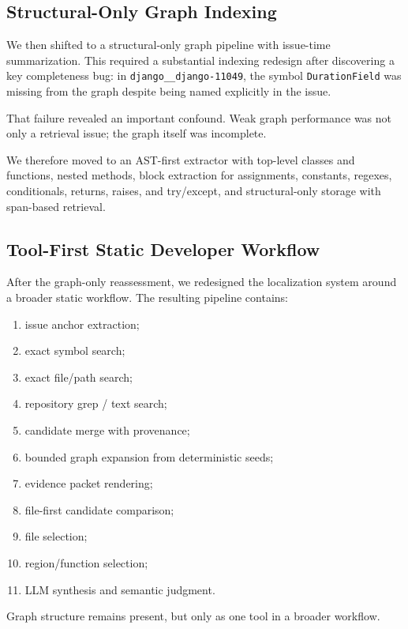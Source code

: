 \documentclass[11pt]{article}
\begin{document}
\subsection{Structural-Only Graph Indexing}

We then shifted to a structural-only graph pipeline with issue-time summarization. This required a substantial indexing redesign after discovering a key completeness bug: in \texttt{django\_\_django-11049}, the symbol \texttt{DurationField} was missing from the graph despite being named explicitly in the issue.

That failure revealed an important confound. Weak graph performance was not only a retrieval issue; the graph itself was incomplete.

We therefore moved to an AST-first extractor with top-level classes and functions, nested methods, block extraction for assignments, constants, regexes, conditionals, returns, raises, and try/except, and structural-only storage with span-based retrieval.

\subsection{Tool-First Static Developer Workflow}

After the graph-only reassessment, we redesigned the localization system around a broader static workflow. The resulting pipeline contains:

\begin{enumerate}
\item issue anchor extraction;
\item exact symbol search;
\item exact file/path search;
\item repository grep / text search;
\item candidate merge with provenance;
\item bounded graph expansion from deterministic seeds;
\item evidence packet rendering;
\item file-first candidate comparison;
\item file selection;
\item region/function selection;
\item LLM synthesis and semantic judgment.
\end{enumerate}

Graph structure remains present, but only as one tool in a broader workflow.
\end{document}

